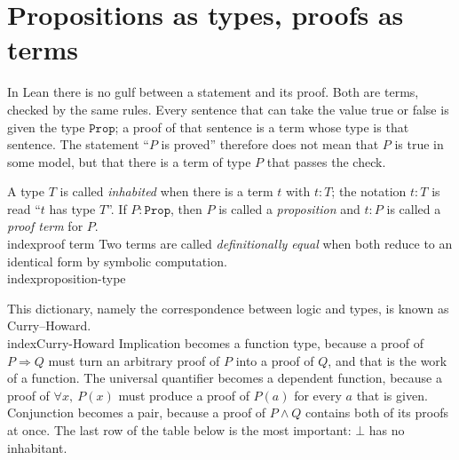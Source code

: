 \section{Propositions as types, proofs as terms}


In Lean there is no gulf between a statement and its proof. Both are terms, checked by the same
rules. Every sentence that can take the value true or false is given the type $\mathtt{Prop}$; a
proof of that sentence is a term whose type is that sentence. The statement ``$P$ is proved''
therefore does not mean that $P$ is true in some model, but that there is a term of type $P$ that
passes the check.


\begin{definisi}
A type $T$ is called \emph{inhabited} when there is a term $t$ with $t:T$; the notation $t:T$ is
read ``$t$ has type $T$''. If $P:\mathtt{Prop}$, then $P$ is called a \emph{proposition} and $t:P$
is called a \emph{proof term} for $P$.\\index{proof term} Two terms are called \emph{definitionally
equal} when both reduce to an identical form by symbolic computation.\\index{proposition-type}
\end{definisi}

This dictionary, namely the correspondence between logic and types, is known as
Curry--Howard.\\index{Curry-Howard} Implication becomes a function type, because a proof of
$P\Rightarrow Q$ must turn an arbitrary proof of $P$ into a proof of $Q$, and that is the work of a
function. The universal quantifier becomes a dependent function, because a proof of
$\forall x,\ P(x)$ must produce a proof of $P(a)$ for every $a$ that is given. Conjunction becomes
a pair, because a proof of $P\wedge Q$ contains both of its proofs at once. The last row of the
table below is the most important: $\bot$ has no inhabitant.


